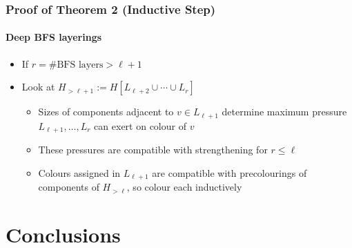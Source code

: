 \documentclass[xcolor=dvipsnames]{beamer}
\begin{document}
\begin{frame}
  \frametitle{Proof of Theorem 2 (Inductive Step)}
  \framesubtitle{Deep BFS layerings}

  \begin{itemize}
    \item If $r=\text{\# BFS layers}>\ell+1$
    \item Look at $H_{> \ell+1}:=H[L_{\ell+2}\cup\cdots\cup L_r]$
    \begin{itemize}
      \item<2-> Sizes of components adjacent to $v\in L_{\ell+1}$ determine maximum pressure $L_{\ell+1},\ldots,L_r$ can exert on colour of $v$
      \item<3-> These pressures are compatible with strengthening for $r\le\ell$
      \item<4-> Colours assigned in $L_{\ell+1}$ are compatible with precolourings
      of components of $H_{>\ell}$, so colour each inductively
    \end{itemize}
    \end{itemize}
    \begin{center}
    \end{center}
\end{frame}

\section{Conclusions}
\end{document}
